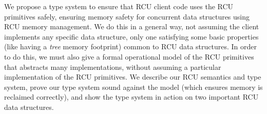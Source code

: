 We propose a type system to ensure that RCU client code uses the RCU primitives safely, ensuring memory safety for concurrent data structures using RCU memory management.
We do this in a general way, not assuming the client implements any specific data structure, only one satisfying some basic properties (like having a \textit{tree} memory footprint) common to RCU data structures.  In order to do this, we must also give a formal operational model of the RCU primitives that abstracts many implementations, without assuming a particular implementation of the RCU primitives.
We describe our RCU semantics and type system, prove our type system sound against the model (which ensures memory is reclaimed correctly), and show the type system in action on two important RCU data structures.

